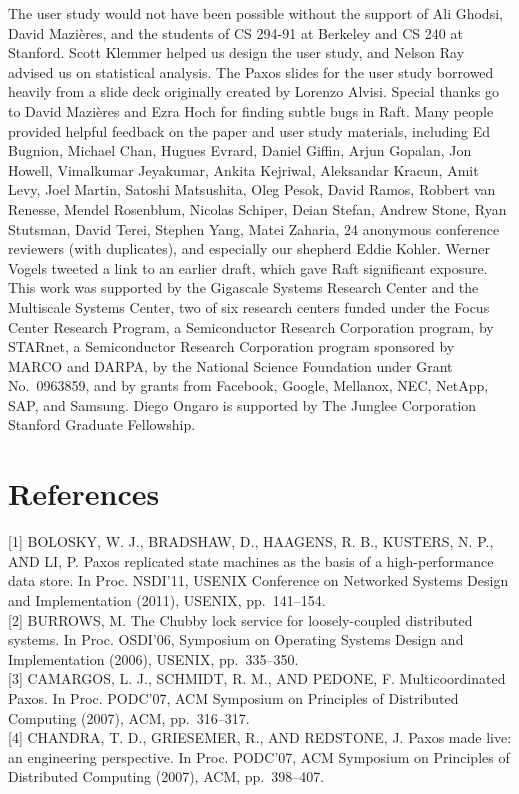 \documentclass[
]{article}
\begin{document}
The user study would not have been possible without the support of Ali
Ghodsi, David Mazières, and the students of CS 294-91 at Berkeley and CS
240 at Stanford. Scott Klemmer helped us design the user study, and
Nelson Ray advised us on statistical analysis. The Paxos slides for the
user study borrowed heavily from a slide deck originally created by
Lorenzo Alvisi. Special thanks go to David Mazières and Ezra Hoch for
finding subtle bugs in Raft. Many people provided helpful feedback on
the paper and user study materials, including Ed Bugnion, Michael Chan,
Hugues Evrard, Daniel Giffin, Arjun Gopalan, Jon Howell, Vimalkumar
Jeyakumar, Ankita Kejriwal, Aleksandar Kracun, Amit Levy, Joel Martin,
Satoshi Matsushita, Oleg Pesok, David Ramos, Robbert van Renesse, Mendel
Rosenblum, Nicolas Schiper, Deian Stefan, Andrew Stone, Ryan Stutsman,
David Terei, Stephen Yang, Matei Zaharia, 24 anonymous conference
reviewers (with duplicates), and especially our shepherd Eddie Kohler.
Werner Vogels tweeted a link to an earlier draft, which gave Raft
significant exposure. This work was supported by the Gigascale Systems
Research Center and the Multiscale Systems Center, two of six research
centers funded under the Focus Center Research Program, a Semiconductor
Research Corporation program, by STARnet, a Semiconductor Research
Corporation program sponsored by MARCO and DARPA, by the National
Science Foundation under Grant No.~0963859, and by grants from Facebook,
Google, Mellanox, NEC, NetApp, SAP, and Samsung. Diego Ongaro is
supported by The Junglee Corporation Stanford Graduate Fellowship.

\section{References}\label{references}

{[}1{]} BOLOSKY, W. J., BRADSHAW, D., HAAGENS, R. B., KUSTERS, N. P.,
AND LI, P. Paxos replicated state machines as the basis of a
high-performance data store. In Proc. NSDI'11, USENIX Conference on
Networked Systems Design and Implementation (2011), USENIX,
pp.~141--154.\\
{[}2{]} BURROWS, M. The Chubby lock service for loosely-coupled
distributed systems. In Proc. OSDI'06, Symposium on Operating Systems
Design and Implementation (2006), USENIX, pp.~335--350.\\
{[}3{]} CAMARGOS, L. J., SCHMIDT, R. M., AND PEDONE, F. Multicoordinated
Paxos. In Proc. PODC'07, ACM Symposium on Principles of Distributed
Computing (2007), ACM, pp.~316--317.\\
{[}4{]} CHANDRA, T. D., GRIESEMER, R., AND REDSTONE, J. Paxos made live:
an engineering perspective. In Proc. PODC'07, ACM Symposium on
Principles of Distributed Computing (2007), ACM, pp.~398--407.
\end{document}
